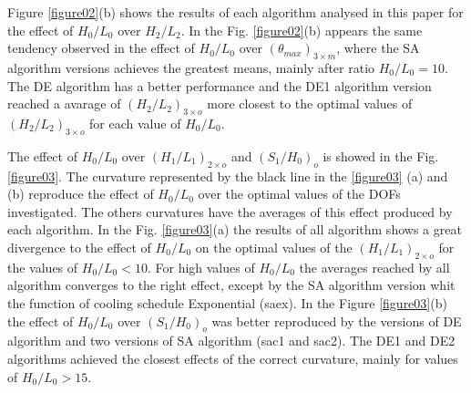 \documentclass[12pt,fleqn]{article}
\begin{document}
Figure \ref{figure02}(b) shows the results of each algorithm analysed in this paper for the effect of  $H_{0}/L_{0}$ over $H_{2}/L_{2}$. In the Fig. \ref{figure02}(b) appears the same tendency observed in the effect of $H_{0}/L_{0}$ over $({\theta}_{max})_{3\times m}$, where the SA algorithm versions achieves the greatest means, mainly after ratio $H_{0}/L_{0}=10$. The DE algorithm has a better performance and the DE1 algorithm version reached a avarage of $(H_{2}/L_{2})_{3\times o}$ more closest to the optimal values of $(H_{2}/L_{2})_{3\times o}$ for each value of  $H_{0}/L_{0}$.

The effect of $H_{0}/L_{0}$ over $(H_{1}/L_{1})_{2\times o}$ and $(S_{1}/H_{0})_{o}$ is showed in the Fig. \ref{figure03}. The curvature represented by the black line in the \ref{figure03} (a) and (b) reproduce the effect of $H_{0}/L_{0}$ over the optimal values of the DOFs investigated. The others curvatures have the averages of this effect produced by each algorithm. In the Fig. \ref{figure03}(a) the results of all algorithm shows a great divergence to the effect of $H_{0}/L_{0}$ on the optimal values of the $(H_{1}/L_{1})_{2\times o}$ for the values of $H_{0}/L_{0}<10$. For high values of $H_{0}/L_{0}$ the averages reached by all algorithm converges to the right effect, except by the SA algorithm version whit the function of cooling schedule Exponential (saex). In the Figure \ref{figure03}(b) the effect of $H_{0}/L_{0}$ over $(S_{1}/H_{0})_{o}$ was better reproduced by the versions of DE algorithm and two versions of SA algorithm (sac1 and sac2). The DE1 and DE2 algorithms achieved the closest effects of the correct curvature, mainly for values of  $H_{0}/L_{0}>15$.
\end{document}
